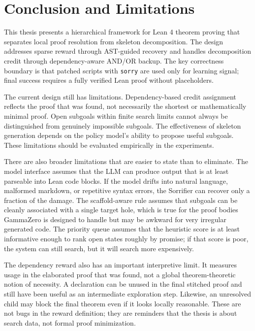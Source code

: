 \documentclass[en]{uet_awesome_thesis/uet-awesome-thesis}
\begin{document}
\chapter{Conclusion and Limitations}
\label{sec:conclusion}

This thesis presents a hierarchical framework for Lean 4 theorem proving that separates local proof resolution from skeleton decomposition. The design addresses sparse reward through AST-guided recovery and handles decomposition credit through dependency-aware AND/OR backup. The key correctness boundary is that patched scripts with \texttt{sorry} are used only for learning signal; final success requires a fully verified Lean proof without placeholders.

The current design still has limitations. Dependency-based credit assignment reflects the proof that was found, not necessarily the shortest or mathematically minimal proof. Open subgoals within finite search limits cannot always be distinguished from genuinely impossible subgoals. The effectiveness of skeleton generation depends on the policy model's ability to propose useful subgoals. These limitations should be evaluated empirically in the experiments.

There are also broader limitations that are easier to state than to eliminate. The model interface assumes that the LLM can produce output that is at least parseable into Lean code blocks. If the model drifts into natural language, malformed markdown, or repetitive syntax errors, the Sorrifier can recover only a fraction of the damage. The scaffold-aware rule assumes that subgoals can be cleanly associated with a single target hole, which is true for the proof bodies GammaZero is designed to handle but may be awkward for very irregular generated code. The priority queue assumes that the heuristic score is at least informative enough to rank open states roughly by promise; if that score is poor, the system can still search, but it will search more expensively.

The dependency reward also has an important interpretive limit. It measures usage in the elaborated proof that was found, not a global theorem-theoretic notion of necessity. A declaration can be unused in the final stitched proof and still have been useful as an intermediate exploration step. Likewise, an unresolved child may block the final theorem even if it looks locally reasonable. These are not bugs in the reward definition; they are reminders that the thesis is about search data, not formal proof minimization.
\end{document}
